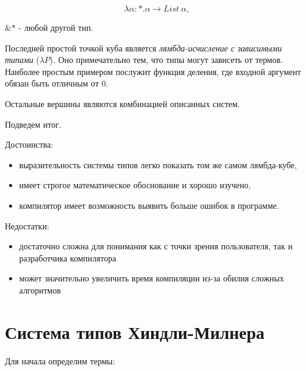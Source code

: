 \begin{equation}
    \label{eq:WTLC}
    \lambda \alpha: *. \alpha \to List ~\alpha,
\end{equation}
\begin{eqrem}
    &$*$ - любой другой тип.\\
\end{eqrem}

Последней простой точкой куба является \textit{лямбда-исчисление с зависимыми типами} ($\lambda P$).
Оно примечательно тем, что типы могут зависеть от термов.
Наиболее простым примером послужит функция деления, где входной аргумент обязан быть отличным от $0$.

Остальные вершины являются комбинацией описанных систем.

Подведем итог.

Достоинства:
\begin{itemize}
    \item выразительность системы типов легко показать том же самом лямбда-кубе,
    \item имеет строгое математическое обоснование и хорошо изучено,
    \item компилятор имеет возможность выявить больше ошибок в программе.
\end{itemize}

Недостатки:
\begin{itemize}
    \item достаточно сложна для понимания как с точки зрения пользователя, так и разработчика компилятора
    \item может значительно увеличить время компиляции из-за обилия сложных алгоритмов
\end{itemize}


\section{Система типов Хиндли-Милнера}
\label{sec:hindley-milner}


Для начала определим термы:

